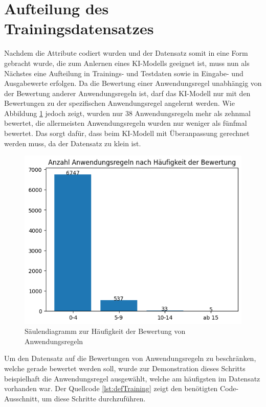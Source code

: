 \section{Aufteilung des Trainingsdatensatzes}
\label{chap:Trainingssplit}
Nachdem die Attribute codiert wurden und der Datensatz somit in eine Form gebracht wurde, die zum Anlernen eines \ac{KI}-Modells geeignet ist, 
muss nun als Nächstes eine Aufteilung in Trainings- und Testdaten sowie in Eingabe- und Ausgabewerte erfolgen. Da die Bewertung einer Anwendungsregel
unabhängig von der Bewertung anderer Anwendungsregeln ist, darf das \ac{KI}-Modell nur mit den Bewertungen zu der spezifischen Anwendungsregel angelernt werden.
Wie Abbildung \ref*{fig:ARMenge} jedoch zeigt, wurden nur 38 Anwendungsregeln mehr als zehnmal bewertet, die allermeisten Anwendungsregeln wurden nur weniger als 
fünfmal bewertet. Das sorgt dafür, dass beim \ac{KI}-Modell mit Überanpassung gerechnet werden muss, da der Datensatz zu klein ist.
\begin{figure}[H]
    \centering
    \includegraphics[width = \textwidth]{abbildungen/BalkenAR.png}
    \caption{Säulendiagramm zur Häufigkeit der Bewertung von Anwendungsregeln}
    \label{fig:ARMenge}
\end{figure}

Um den Datensatz auf die Bewertungen von Anwendungsregeln zu beschränken, welche gerade bewertet werden soll, wurde zur Demonstration dieses Schritts 
beispielhaft die Anwendungsregel ausgewählt, welche am häufigsten im Datensatz vorhanden war. Der Quellcode \ref*{lst:defTraining} zeigt den benötigten Code-Ausschnitt,
um diese Schritte durchzuführen.

